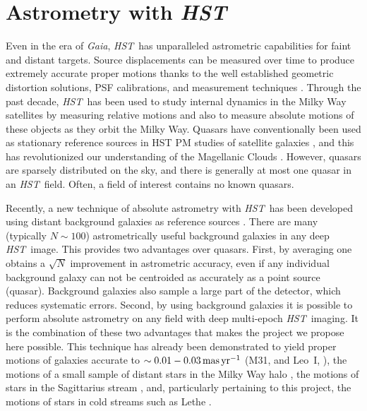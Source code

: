 \documentclass[12pt]{article}
\newcommand{\hst}{\textsl{HST}}
\newcommand{\gaia}{\textsl{Gaia}}
\begin{document}
%
%
\describeobservations   %
\vspace{-0.5cm}
\section*{Astrometry with \hst}
Even in the era of \gaia, \hst\ has unparalleled astrometric capabilities for faint and distant targets.
Source displacements can be measured over time to produce extremely accurate proper motions thanks to the well established geometric distortion solutions, PSF calibrations, and measurement techniques \parencite[e.g.,][]{anderson2003}.
Through the past decade, \hst\ has been used to study internal dynamics in the Milky Way satellites by measuring relative motions \parencite[e.g., ][]{anderson2010} and also to measure absolute motions of these objects as they orbit the Milky Way.
Quasars have conventionally been used as stationary reference sources in HST PM studies of satellite galaxies \parencite[e.g.,][]{kallivayalil2006, kallivayalil2013, piatek2008}, and this has revolutionized our understanding of the Magellanic Clouds \parencite{besla2007}.
However, quasars are sparsely distributed on the sky, and there is generally at most one quasar in an \hst\ field.
Often, a field of interest contains no known quasars.

Recently, a new technique of absolute astrometry with \hst\ has been developed using distant background galaxies as reference sources \parencite[e.g.,][]{mahmud2008, sohn2012,sohn2013}.
There are many (typically $N\sim100$) astrometrically useful background galaxies in any deep \hst\ image.
This provides two advantages over quasars.
First, by averaging one obtains a $\sqrt{N}$ improvement in astrometric accuracy, even if any individual background galaxy can not be centroided as accurately as a point source (quasar).
Background galaxies also sample a large part of the detector, which reduces systematic errors.
Second, by using background galaxies it is possible to perform absolute astrometry on any field with deep multi-epoch \hst\ imaging.
It is the combination of these two advantages that makes the project we propose here possible.
This technique has already been demonstrated to yield proper motions of galaxies accurate to $\sim0.01-0.03\,\rm mas\,yr^{-1}$ (M31, \cite{sohn2012,vdmarel2012a,vdmarel2012b} and Leo~I, \cite{sohn2013}), the motions of a small sample of distant stars in the Milky Way halo \parencite{deason2013}, the motions of stars in the Sagittarius stream \parencite{sohn2015}, and, particularly pertaining to this project, the motions of stars in cold streams such as Lethe \parencite[Figure~\ref{fig:lethe},][]{sohn2016}.
\end{document}
